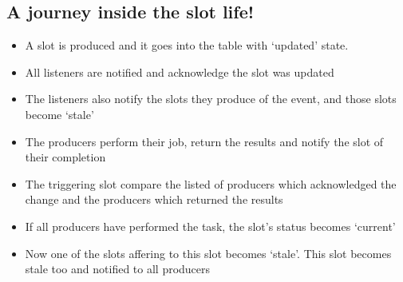 \documentclass[letterpaper,10pt,english]{sphinxmanual}
\begin{document}
\subsection{A journey inside the slot life!}
\label{\detokenize{slot_prod:a-journey-inside-the-slot-life}}\begin{itemize}
\item {} 
A slot is produced and it goes into the table with ‘updated’ state.

\item {} 
All listeners are notified and acknowledge the slot was updated

\item {} 
The listeners also notify the slots they produce of the event, and those slots
become ‘stale’

\item {} 
The producers perform their job, return the results and notify the slot  of
their completion

\item {} 
The triggering slot compare the listed of producers which acknowledged the
change and the producers which returned the results

\item {} 
If all producers have performed the task, the slot’s status becomes ‘current’

\item {} 
Now one of the slots affering to this slot becomes ‘stale’. This slot becomes
stale too and notified to all producers

\end{itemize}
\end{document}
